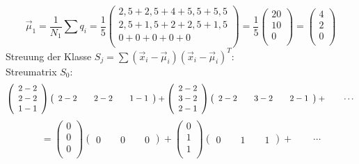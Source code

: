 \documentclass{article}
\begin{document}
\[
\vec{\mu}_1 = \frac{1}{N_1} \sum{q_i} = \frac{1}{5}
\left(
\begin {array} {c}
2,5 + 2,5 + 4 + 5,5 + 5,5 \\
2,5 + 1,5 + 2 + 2,5 + 1,5 \\
0 + 0 + 0 + 0 + 0 \\
\end{array}
\right)
= \frac{1}{5}
\left(
\begin {array} {c}
20 \\
10 \\
0 \\
\end {array}
\right)
=
\left(
\begin {array} {c}
4 \\
2 \\
0 \\
\end {array}
\right)
\]
Streuung der Klasse $S_j = \sum{(\vec{x}_i - \vec{\mu}_i)(\vec{x}_i - \vec{\mu}_i)^T}$: \\
Streumatrix $S_0$:
\[ 
\left(
\begin {array} {c}
2 - 2 \\
2 - 2 \\
1 - 1 \\
\end {array}
\right)
\left(
\begin {array} {c}
2 - 2 \qquad 2 - 2 \qquad 1 - 1 
\end {array}
\right) 
+
\left(
\begin {array} {c}
2 - 2 \\
3 - 2 \\
2 - 1 \\
\end {array}
\right)
\left(
\begin {array} {c}
2 - 2 \qquad 3 - 2 \qquad 2 - 1 
\end {array}
\right)
+ \qquad \cdots \\ 
\]
\[
= 
\left(
\begin {array} {c}
0 \\
0 \\
0 \\
\end {array}
\right)
\left(
\begin {array} {c}
0 \qquad 0 \qquad 0 
\end {array}
\right) 
+
\left(
\begin {array} {c}
0 \\
1 \\
1 \\
\end {array}
\right)
\left(
\begin {array} {c}
0 \qquad 1 \qquad 1 
\end {array}
\right)
+ \qquad \cdots
\]
\end{document}
